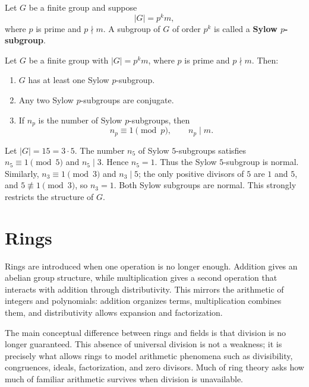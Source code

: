 \begin{definition}
Let $G$ be a finite group and suppose
\[
    |G|=p^k m,
\]
where $p$ is prime and $p\nmid m$. A subgroup of $G$ of order $p^k$ is called a \textbf{Sylow $p$-subgroup}.
\end{definition}

\begin{theorem}
Let $G$ be a finite group with $|G|=p^k m$, where $p$ is prime and $p\nmid m$. Then:
\begin{enumerate}
    \item $G$ has at least one Sylow $p$-subgroup.
    \item Any two Sylow $p$-subgroups are conjugate.
    \item If $n_p$ is the number of Sylow $p$-subgroups, then
    \[
        n_p\equiv 1\pmod p,
        \qquad
        n_p\mid m.
    \]
\end{enumerate}
\end{theorem}


\begin{example}
Let $|G|=15=3\cdot 5$. The number $n_5$ of Sylow $5$-subgroups satisfies $n_5\equiv 1\pmod 5$ and $n_5\mid 3$. Hence $n_5=1$. Thus the Sylow $5$-subgroup is normal. Similarly, $n_3\equiv 1\pmod 3$ and $n_3\mid 5$; the only positive divisors of $5$ are $1$ and $5$, and $5\not\equiv 1\pmod 3$, so $n_3=1$. Both Sylow subgroups are normal. This strongly restricts the structure of $G$.
\end{example}

\section{Rings}


Rings are introduced when one operation is no longer enough. Addition gives an abelian group structure, while multiplication gives a second operation that interacts with addition through distributivity. This mirrors the arithmetic of integers and polynomials: addition organizes terms, multiplication combines them, and distributivity allows expansion and factorization.

The main conceptual difference between rings and fields is that division is no longer guaranteed. This absence of universal division is not a weakness; it is precisely what allows rings to model arithmetic phenomena such as divisibility, congruences, ideals, factorization, and zero divisors. Much of ring theory asks how much of familiar arithmetic survives when division is unavailable.

